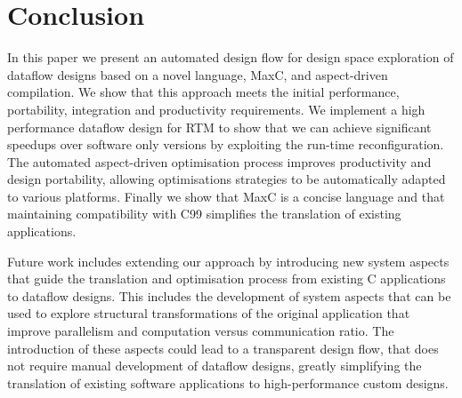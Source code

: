 \section{Conclusion}

In this paper we present an automated design flow for design space
exploration of dataflow designs based on a novel language, MaxC, and
aspect-driven compilation. We show that this approach meets the
initial performance, portability, integration and productivity
requirements. We implement a high performance dataflow design for RTM
to show that we can achieve significant speedups over software only
versions by exploiting the run-time reconfiguration. The automated
aspect-driven optimisation process improves productivity and design
portability, allowing optimisations strategies to be automatically
adapted to various platforms.  Finally we show that MaxC is a concise
language and that maintaining compatibility with C99 simplifies the
translation of existing applications.

Future work includes extending our approach by introducing new system
aspects that guide the translation and optimisation process from
existing C applications to dataflow designs. This includes the
development of system aspects that can be used to explore structural
transformations of the original application that improve parallelism
and computation versus communication ratio. The introduction of these
aspects could lead to a transparent design flow, that does not require
manual development of dataflow designs, greatly simplifying the
translation of existing software applications to high-performance
custom designs.
